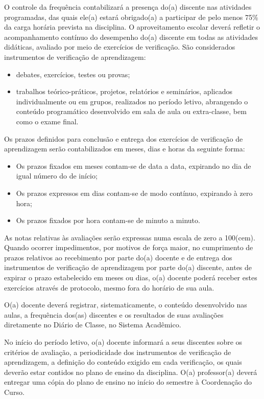 O controle da frequência contabilizará a presença do(a) discente nas atividades programadas, das quais ele(a) estará obrigado(a) a participar de pelo menos 75\% da carga horária prevista na disciplina. O aproveitamento escolar deverá refletir o acompanhamento contínuo do desempenho do(a) discente em todas as atividades didáticas, avaliado por meio de exercícios de verificação. São considerados instrumentos de verificação de aprendizagem:

\begin{itemize}
	\item debates, exercícios, testes ou provas;
	\item trabalhos teórico-práticos, projetos, relatórios e seminários, aplicados individualmente ou em grupos, realizados no período letivo, abrangendo o conteúdo programático desenvolvido em sala de aula ou extra-classe, bem como o exame final. 
\end{itemize}

Os prazos definidos para conclusão e entrega dos exercícios de verificação de aprendizagem serão contabilizados em meses, dias e horas da seguinte forma:

\begin{itemize}
	\item Os prazos fixados em meses contam-se de data a data, expirando no dia de igual número do de início; 
	\item Os prazos expressos em dias contam-se de modo contínuo, expirando à zero hora; 
	\item Os prazos fixados por hora contam-se de minuto a minuto.
\end{itemize}

	As notas relativas às avaliações serão expressas numa escala de zero a 100(cem). Quando ocorrer impedimentos, por motivos de força maior, no cumprimento de prazos relativos ao recebimento por parte do(a) docente e de entrega dos instrumentos de verificação de aprendizagem por parte do(a) discente, antes de expirar o prazo estabelecido em meses ou dias, o(a) docente poderá receber estes exercícios através de protocolo, mesmo fora do horário de sua aula. 

	O(a) docente deverá registrar, sistematicamente, o conteúdo desenvolvido nas aulas, a frequência dos(as) discentes e os resultados de suas avaliações diretamente no Diário de Classe, no Sistema Acadêmico.

	No início do período letivo, o(a) docente informará a seus discentes sobre os critérios de avaliação, a periodicidade dos instrumentos de verificação de aprendizagem, a definição do conteúdo exigido em cada verificação, os quais deverão estar contidos no plano de ensino da disciplina. O(a) professor(a) deverá entregar uma cópia do plano de ensino no início do semestre à Coordenação do Curso. 

